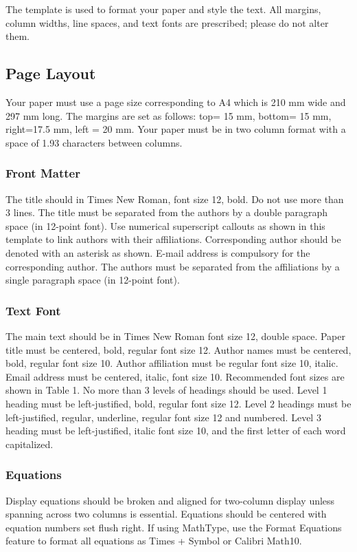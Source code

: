 \documentclass{siintec}
\begin{document}
The template is used to format your paper and style the text. All margins, column widths, line spaces, and text fonts are prescribed; please do not alter them.

\subsection{Page Layout}
Your paper must use a page size corresponding to A4 which is 210 mm wide and 297 mm long. The margins are set as follows: top= 15 mm, bottom= 15 mm, right=17.5 mm, left = 20 mm. Your paper must be in two column format with a space of 1.93 characters between columns.

\subsubsection{Front Matter}
The title should in Times New Roman, font size 12, bold. Do not use more than 3 lines. The title must be separated from the authors by a double paragraph space (in 12-point font). Use numerical superscript callouts as shown in this template to link authors with their affiliations.
Corresponding author should be denoted with an asterisk as shown. E-mail address is compulsory for the corresponding author.
The authors must be separated from the affiliations by a single paragraph space (in 12-point font).

\subsubsection{Text Font}
The main text should be in Times New Roman font size 12, double space. Paper title must be centered, bold, regular font size 12. Author names must be centered, bold, regular font size 10. Author affiliation must be regular font size 10, italic. Email address must be centered, italic, font size 10. Recommended font sizes are shown in Table 1. No more than 3 levels of headings should be used. Level 1 heading must be left-justified, bold, regular font size 12. Level 2 headings must be left-justified, regular, underline, regular font size 12 and numbered. Level 3 heading must be left-justified, italic font size 10, and the first letter of each word capitalized.

\subsubsection{Equations}
Display equations should be broken and aligned for two-column display unless spanning across two columns is essential. Equations should be centered with equation numbers set flush right. If using MathType, use the Format Equations feature to format all equations as Times + Symbol  or Calibri Math10.
\end{document}
